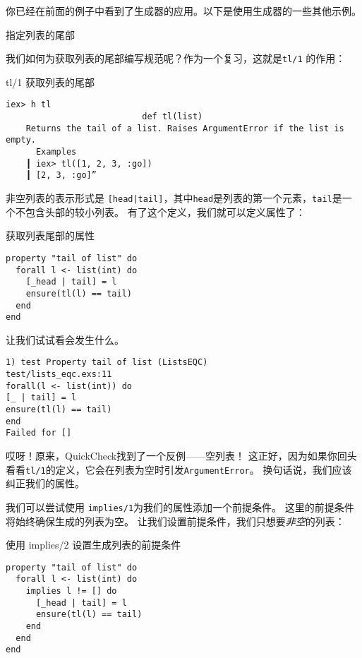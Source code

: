 你已经在前面的例子中看到了生成器的应用。以下是使用生成器的一些其他示例。

\begin{example}{指定列表的尾部}

我们如何为获取列表的尾部编写规范呢？作为一个复习，这就是\texttt{tl/1} 的作用：

\begin{code}{tl/1 获取列表的尾部}
\begin{verbatim}
iex> h tl          
                           def tl(list) 
    Returns the tail of a list. Raises ArgumentError if the list is empty. 
      Examples 
    ┃ iex> tl([1, 2, 3, :go])
    ┃ [2, 3, :go]”
\end{verbatim}
\label{lst:tl_1_gets_the_tail_of_a_list}
\end{code}

非空列表的表示形式是 \texttt{[head|tail]}，其中\texttt{head}是列表的第一个元素，\texttt{tail}是一个不包含头部的较小列表。
有了这个定义，我们就可以定义属性了：


\begin{code}{获取列表尾部的属性}
\begin{verbatim}
property "tail of list" do
  forall l <- list(int) do
    [_head | tail] = l
    ensure(tl(l) == tail)
  end
end
\end{verbatim}
\label{lst:property_to_get_the_tail_of_a_list}
\end{code}

让我们试试看会发生什么。

\begin{code}{}
\begin{verbatim}
1) test Property tail of list (ListsEQC)
test/lists_eqc.exs:11
forall(l <- list(int)) do
[_ | tail] = l
ensure(tl(l) == tail)
end
Failed for []
\end{verbatim}
\end{code}

哎呀！原来，QuickCheck找到了一个反例------空列表！
这正好，因为如果你回头看看\texttt{tl/1}的定义，它会在列表为空时引发\texttt{ArgumentError}。
换句话说，我们应该纠正我们的属性。

我们可以尝试使用 \texttt{implies/1}为我们的属性添加一个前提条件。
这里的前提条件将始终确保生成的列表为空。
让我们设置前提条件，我们只想要\emph{非空}的列表：


\begin{code}{使用 implies/2 设置生成列表的前提条件}
\begin{verbatim}
property "tail of list" do
  forall l <- list(int) do
    implies l != [] do
      [_head | tail] = l
      ensure(tl(l) == tail)
    end
  end
end
\end{verbatim}
\label{lst:using_implies_2_to_set_a_precondition_for_the_generated_list}
\end{code}


\end{example}
